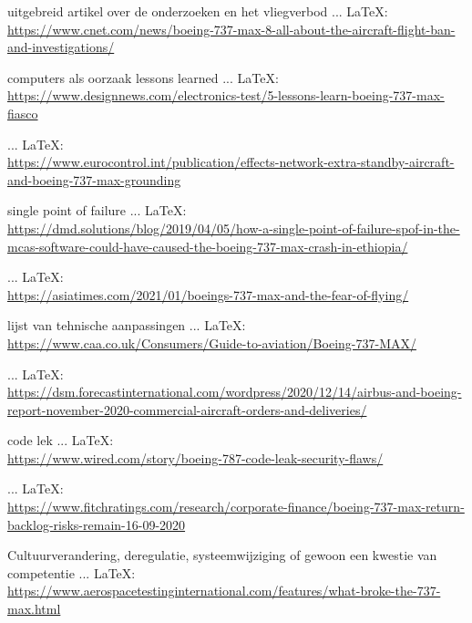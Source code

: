\begin{thebibliography}{99}
{{{{{{{{							uitgebreid artikel over de onderzoeken en het vliegverbod
							 ... \LaTeX:\\ \url{https://www.cnet.com/news/boeing-737-max-8-all-about-the-aircraft-flight-ban-and-investigations/}
							
							computers als oorzaak
							lessons learned
							 ... \LaTeX:\\ \url{https://www.designnews.com/electronics-test/5-lessons-learn-boeing-737-max-fiasco}
							
							 ... \LaTeX:\\ \url{https://www.eurocontrol.int/publication/effects-network-extra-standby-aircraft-and-boeing-737-max-grounding}
							
							single point of failure
							 ... \LaTeX:\\ \url{https://dmd.solutions/blog/2019/04/05/how-a-single-point-of-failure-spof-in-the-mcas-software-could-have-caused-the-boeing-737-max-crash-in-ethiopia/}
							
							
							 ... \LaTeX:\\ \url{https://asiatimes.com/2021/01/boeings-737-max-and-the-fear-of-flying/}
							
							lijst van tehnische aanpassingen
							 ... \LaTeX:\\ \url{https://www.caa.co.uk/Consumers/Guide-to-aviation/Boeing-737-MAX/}
							
							 ... \LaTeX:\\ \url{https://dsm.forecastinternational.com/wordpress/2020/12/14/airbus-and-boeing-report-november-2020-commercial-aircraft-orders-and-deliveries/}
							
							code lek
							 ... \LaTeX:\\ \url{https://www.wired.com/story/boeing-787-code-leak-security-flaws/}
							
							 ... \LaTeX:\\ \url{https://www.fitchratings.com/research/corporate-finance/boeing-737-max-return-backlog-risks-remain-16-09-2020}
							
							Cultuurverandering, deregulatie, systeemwijziging of gewoon een kwestie van competentie
							 ... \LaTeX:\\ \url{https://www.aerospacetestinginternational.com/features/what-broke-the-737-max.html}
							
}}}}}}}}
\end{thebibliography}
